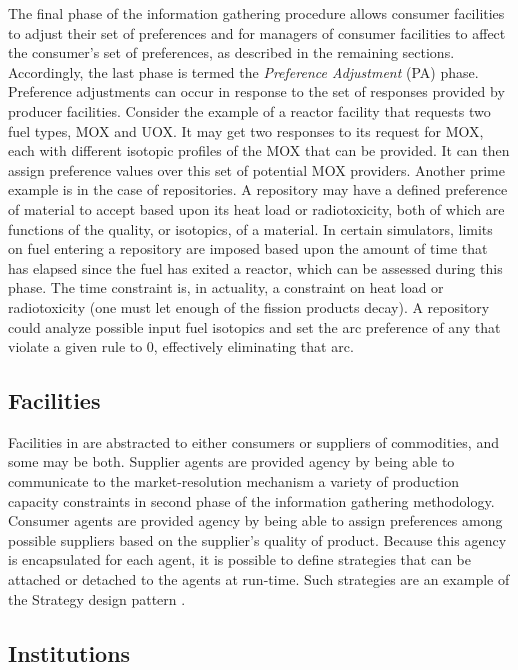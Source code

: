 The final phase of the information gathering procedure allows consumer
facilities to adjust their set of preferences and for managers of consumer
facilities to affect the consumer's set of preferences, as described in the
remaining sections. Accordingly, the last phase is termed the \textit{Preference
 Adjustment} (PA) phase. Preference adjustments can occur in response to the
set of responses provided by producer facilities. Consider the example of a
reactor facility that requests two fuel types, MOX and UOX. It may get two
responses to its request for MOX, each with different isotopic profiles of the
MOX that can be provided. It can then assign preference values over this set of
potential MOX providers. Another prime example is in the case of repositories. A
repository may have a defined preference of material to accept based upon its
heat load or radiotoxicity, both of which are functions of the quality, or
isotopics, of a material. In certain simulators, limits on fuel entering a
repository are imposed based upon the amount of time that has elapsed since the
fuel has exited a reactor, which can be assessed during this phase. The time
constraint is, in actuality, a constraint on heat load or radiotoxicity (one
must let enough of the fission products decay). A repository could analyze
possible input fuel isotopics and set the arc preference of any that violate a
given rule to 0, effectively eliminating that arc.

\subsection{Facilities}

Facilities in \Cyclus are abstracted to either consumers or suppliers of
commodities, and some may be both. Supplier agents are provided agency by being
able to communicate to the market-resolution mechanism a variety of production
capacity constraints in second phase of the information gathering
methodology. Consumer agents are provided agency by being able to assign
preferences among possible suppliers based on the supplier's quality of
product. Because this agency is encapsulated for each agent, it is possible to
define strategies that can be attached or detached to the agents at
run-time. Such strategies are an example of the Strategy design pattern
\cite{vlissides_design_1995}.

\subsection{Institutions}

